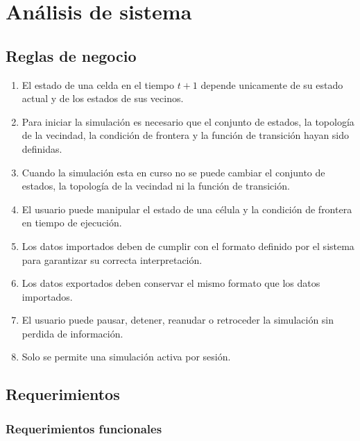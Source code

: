 \section{Análisis de sistema}

\subsection{Reglas de negocio}

\begin{enumerate}[label*=RN\arabic*]
	\item El estado de una celda en el tiempo $t + 1$ depende unicamente de su estado actual y de los estados de sus vecinos.
	\item Para iniciar la simulación es necesario que el conjunto de estados, la topología de la vecindad, la condición de frontera y la función de transición hayan sido definidas. 
	\item Cuando la simulación esta en curso no se puede cambiar el conjunto de estados, la topología de la vecindad ni la función de transición.
	\item El usuario puede manipular el estado de una célula y la condición de frontera en tiempo de ejecución.
	\item Los datos importados deben de cumplir con el formato definido por el sistema para garantizar su correcta interpretación.
	\item Los datos exportados deben conservar el mismo formato que los datos importados.
	\item El usuario puede pausar, detener, reanudar o retroceder la simulación sin perdida de información. 
	\item Solo se permite una simulación activa por sesión.
\end{enumerate}

\subsection{Requerimientos}

\subsubsection{Requerimientos funcionales}

